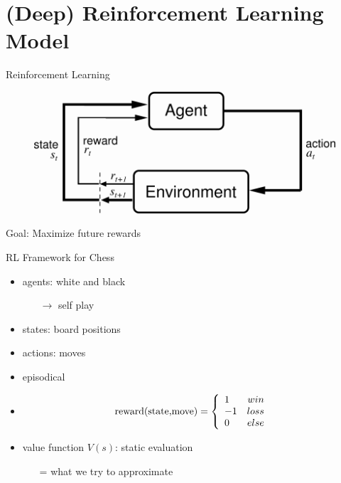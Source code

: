 \documentclass{beamer}
\begin{document}
\section{(Deep) Reinforcement Learning Model}

\begin{frame}{Reinforcement Learning}
	\begin{figure}
		\includegraphics[scale=0.6]{figtmp7}
	\end{figure}
    Goal: Maximize future rewards\\
\end{frame}

\begin{frame}{RL Framework for Chess}
	\begin{itemize}
		\item agents: white and black
		\begin{itemize}
			\item[$\rightarrow$] self play
		\end{itemize}
        \item states: board positions
        \item actions: moves
        \item episodical
        \item \[\textnormal{reward(state,move)} = \left\{
  \begin{array}{lr}
    1 &  win\\
    -1 & loss\\
    0 & else \\
  \end{array}
\right.
\]
		\item value function $V(s)$: static evaluation
		\begin{itemize}
			\item[=] what we try to approximate
		\end{itemize}
	\end{itemize}

\end{frame}
\end{document}
